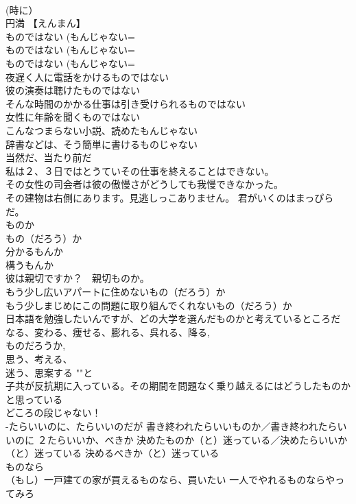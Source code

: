 \documentclass[8pt]{extreport}
\begin{document}
\begin{CJK}{UTF8}{min}
\\	(時に）
\\	円満 【えんまん】 
\\	ものではない (もんじゃない=
\\	ものではない (もんじゃない=
\\	ものではない (もんじゃない=
\\	夜遅く人に電話をかけるものではない 
\\	彼の演奏は聴けたものではない 
\\	そんな時間のかかる仕事は引き受けられるものではない 
\\	女性に年齢を聞くものではない 
\\	こんなつまらない小説、読めたもんじゃない 
\\	辞書などは、そう簡単に書けるものじゃない 
\\	当然だ、当たり前だ 
\\	私は２、３日ではとうていその仕事を終えることはできない。 
\\	その女性の司会者は彼の傲慢さがどうしても我慢できなかった。 
\\	その建物は右側にあります。見逃しっこありません。 君がいくのはまっぴらだ。
\\	ものか 
\\	もの（だろう）か	
\\	分かるもんか 
\\	構うもんか 
\\	彼は親切ですか？　親切ものか。 
\\	もう少し広いアパートに住めないもの（だろう）か 
\\	もう少しまじめにこの問題に取り組んでくれないもの（だろう）か 
\\	日本語を勉強したいんですが、どの大学を選んだものかと考えているところだ 
\\	なる、変わる、痩せる、膨れる、呉れる、降る,
\\	ものだろうか, 
\\	思う、考える、
\\	迷う、思案する ""と
\\	子共が反抗期に入っている。その期間を問題なく乗り越えるにはどうしたものかと思っている 
\\	どころの段じゃない！ 
\\	-たらいいのに、たらいいのだが 書き終われたらいいものか／書き終われたらいいのに ２たらいいか、べきか 決めたものか（と）迷っている／決めたらいいか（と）迷っている 決めるべきか（と）迷っている
\\	ものなら 
\\	（もし）一戸建ての家が買えるものなら、買いたい 一人でやれるものならやってみろ 

\end{CJK}
\end{document}
